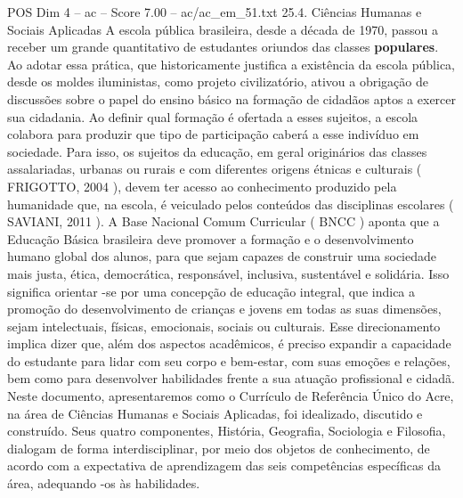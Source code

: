 \begin{textsample}{POS Dim 4 – ac – Score 7.00 – ac/ac\_em\_51.txt}  \label{ex:f4_pos_243}
25.4.
Ciências Humanas e Sociais Aplicadas A escola pública brasileira, desde a década de 1970, passou a receber um grande quantitativo de estudantes oriundos das classes \textbf{populares}.
Ao adotar essa prática, que historicamente justifica a existência da escola pública, desde os moldes iluministas, como projeto civilizatório, ativou a obrigação de discussões sobre o papel do ensino básico na formação de cidadãos aptos a exercer sua cidadania.
Ao definir qual formação é ofertada a esses sujeitos, a escola colabora para produzir que tipo de participação caberá a esse indivíduo em sociedade.
Para isso, os sujeitos da educação, em geral originários das classes assalariadas, urbanas ou rurais e com diferentes origens étnicas e culturais ( FRIGOTTO, 2004 ), devem ter acesso ao conhecimento produzido pela humanidade que, na escola, é veiculado pelos conteúdos das disciplinas escolares ( SAVIANI, 2011 ).
A Base Nacional Comum Curricular ( BNCC ) aponta que a Educação Básica brasileira deve promover a formação e o desenvolvimento humano global dos alunos, para que sejam capazes de construir uma sociedade mais justa, ética, democrática, responsável, inclusiva, sustentável e solidária.
Isso significa orientar -se por uma concepção de educação integral, que indica a promoção do desenvolvimento de crianças e jovens em todas as suas dimensões, sejam intelectuais, físicas, emocionais, sociais ou culturais.
Esse direcionamento implica dizer que, além dos aspectos acadêmicos, é preciso expandir a capacidade do estudante para lidar com seu corpo e bem-estar, com suas emoções e relações, bem como para desenvolver habilidades frente a sua atuação profissional e cidadã.
Neste documento, apresentaremos como o Currículo de Referência Único do Acre, na área de Ciências Humanas e Sociais Aplicadas, foi idealizado, discutido e construído.
Seus quatro componentes, História, Geografia, Sociologia e Filosofia, dialogam de forma interdisciplinar, por meio dos objetos de conhecimento, de acordo com a expectativa de aprendizagem das seis competências específicas da área, adequando -os às habilidades.

\end{textsample}
